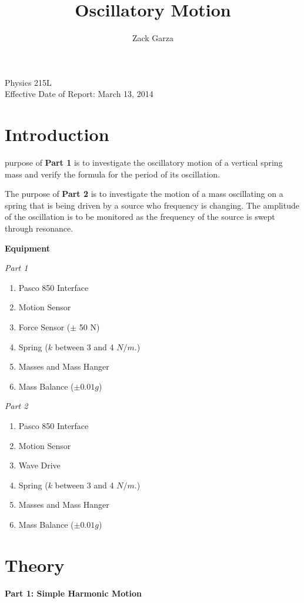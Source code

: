 \documentclass[twocolumn,english]{IEEEtran}
\theoremstyle{plain}
\theoremstyle{plain}
\begin{document}
\title{Oscillatory Motion}


\author{Zack Garza}


\IEEEspecialpapernotice
{Physics 215L \\
Effective Date of Report: March 13, 2014 }


\maketitle
\tableofcontents

\section{Introduction}
 purpose of \textbf{Part 1} is to investigate the oscillatory motion of a vertical spring mass and verify the formula for the period of its oscillation.

The purpose of \textbf{Part 2} is to investigate the motion of a mass oscillating on a spring that is being driven by a source who frequency is changing. The amplitude of the oscillation is to be monitored as the frequency of the source is swept through resonance.


\noindent\textbf{Equipment}

\textit{Part 1}
\begin{enumerate}
  \item Pasco 850 Interface
  \item Motion Sensor
  \item Force Sensor ($\pm$ 50 N)
  \item Spring ($k$ between 3 and 4 $N/m$.)
  \item Masses and Mass Hanger
  \item Mass Balance ($\pm 0.01 g$)
\end{enumerate}

\textit{Part 2}
\begin{enumerate}
\item Pasco 850 Interface
\item Motion Sensor
\item Wave Drive
\item Spring ($k$ between 3 and 4 $N/m$.)
\item Masses and Mass Hanger
\item Mass Balance ($\pm0.01g$)
\end{enumerate}

\section{Theory}
\noindent\textbf{Part 1: Simple Harmonic Motion}
\end{document}
